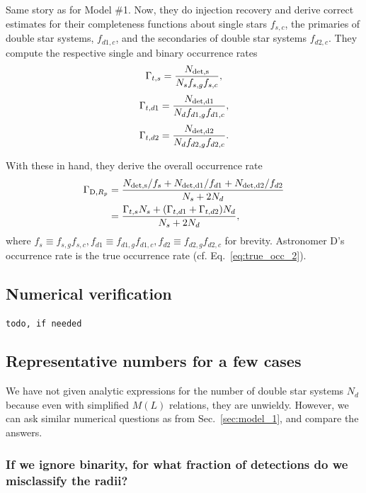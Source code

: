 \documentclass{emulateapj}
\begin{document}
Same story as for Model \#1.
Now, they do injection recovery and derive correct estimates for their 
completeness functions about single stars $f_{s,c}$, the primaries of double 
star systems, $f_{d1,c}$, and the secondaries of double star systems 
$f_{d2,c}$.
They compute the respective single and binary 
occurrence rates
\begin{equation}
\Gamma_{t,s} = \frac{N_{\rm det,s}}{N_s f_{s,g} f_{s,c}},
\end{equation}
\begin{equation}
\Gamma_{t,d1} = \frac{N_{\rm det,d1}}{N_d f_{d1,g} f_{d1,c}},
\end{equation}
\begin{equation}
\Gamma_{t,d2} = \frac{N_{\rm det,d2}}{N_d f_{d2,g} f_{d2,c}}.
\end{equation}

With these in hand, they derive the overall occurrence rate
\begin{align}
\Gamma_{{\rm D}, R_p} 
&= \frac{
	N_{\rm det,s}/f_s + 
	N_{\rm det,d1}/f_{d1} +
	N_{\rm det,d2}/f_{d2}
	}
	{N_s + 2 N_d} \\
&= \frac{\Gamma_{t,s} N_s + (\Gamma_{t,d1} + \Gamma_{t,d2})N_d}
				{N_s + 2 N_d},
\end{align}
where $f_s \equiv f_{s,g}f_{s,c}, f_{d1} \equiv f_{d1,g}f_{d1,c}, 
f_{d2} \equiv f_{d2,g}f_{d2,c}$ for brevity.
Astronomer D's occurrence rate is the true occurrence rate (cf. 
Eq.~\ref{eq:true_occ_2}).


\subsection{Numerical verification}
\texttt{todo, if needed}


\subsection{Representative numbers for a few cases}

We have not given analytic expressions for the number of double star systems 
$N_d$ because even with simplified $M(L)$ relations, they are unwieldy.
However, we can ask similar numerical questions as from Sec.~\ref{sec:model_1}, 
and compare the answers.


\subsubsection{If we ignore binarity, for what fraction of detections do we
misclassify the radii?}
\end{document}
